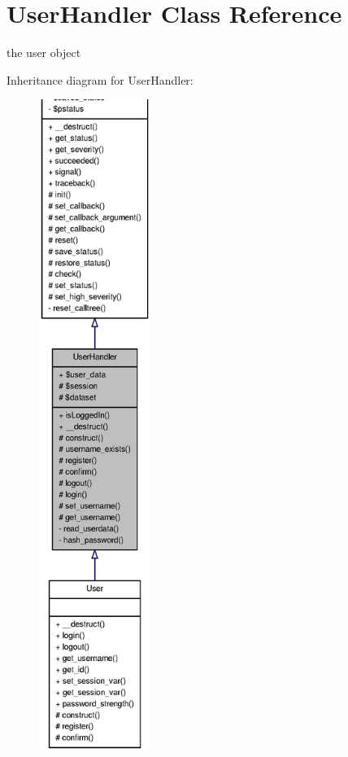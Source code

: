 \section{UserHandler Class Reference}
\label{classUserHandler}


the user object  




Inheritance diagram for UserHandler:\nopagebreak
\begin{figure}[H]
\begin{center}
\leavevmode
\includegraphics[height=600pt]{classUserHandler__inherit__graph}
\end{center}
\end{figure}


